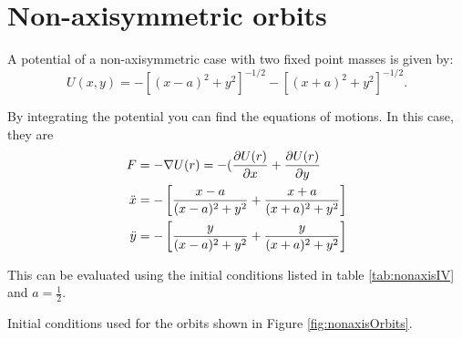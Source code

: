 \section{Non-axisymmetric orbits}

A potential of a non-axisymmetric case with two fixed point
masses is given by:
\begin{equation}
    U(x,y) = -[(x-a)^2 +y^2]^{-1/2} -[(x+a)^2 +y^2]^{-1/2}.
    \label{eq:non-axisymmetric}
\end{equation}


By integrating the potential you can find the equations of motions. In this case, they are
\begin{align*}
    F&=-\nabla U(r) =-(\frac{\partial U(r)}{\partial x}+\frac{\partial U(r)}{\partial y}\\
    \Ddot{x}&=-\left[\frac{x-a}{(x-a)^2+y^2}+\frac{x+a}{(x+a)^2+y^2}\right] \\
    \Ddot{y}&=- \left[\frac{y}{(x-a)^2+y^2}+\frac{y}{(x+a)^2+y^2}\right]
\end{align*}


This can be evaluated using the initial conditions listed in table \ref{tab:nonaxisIV} and $a= \frac{1}{2}$.


\begin{table}[]
    \centering

    \caption{Initial conditions used for the orbits shown in Figure \ref{fig:nonaxisOrbits}.}
    \label{tab:nonaxisIV}
\end{table}


